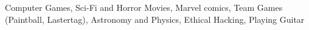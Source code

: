 
\begin{cvparagraph}
  {Computer Games, Sci-Fi and Horror Movies, Marvel comics, Team Games (Paintball, Lastertag), Astronomy and Physics, Ethical Hacking, Playing Guitar}
\end{cvparagraph}

